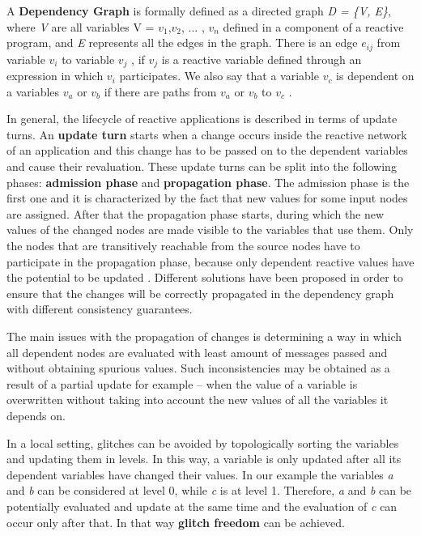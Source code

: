 \documentclass{sigplanconf}
\begin{document}
A \textbf{Dependency Graph} is formally defined as a directed graph \textit{D = \{V, E\}}, where \textit{V} are all variables V = $v_{1}$,$ v_{2}$, ... , $v_{n}$  defined in a component of a reactive program, and \textit{E} represents all the edges in the graph. There is an edge $e_{ij}$ from variable $v_{ i}$ to variable $v_{j}$ , if  $v_{j}$ is a reactive variable defined through an expression in which $v_{i}$ participates.  We also say that a variable $v_{c}$ is dependent on a variables $v_{a}$ or $v_{b}$ if there are paths from $v_{a}$ or $v_{b}$ to $v_{c}$ \cite{dream}.

In general, the lifecycle of reactive applications is described in terms of update turns.  An \textbf{update turn} starts when a change occurs inside the reactive network of an application and this change has to be passed on to the dependent variables and cause their revaluation. These update turns can be split into the following phases: \textbf{admission phase} and \textbf{propagation phase}. The admission phase is the first one and it is characterized by the fact that new values for some input nodes are assigned. After that the propagation phase starts, during which the new values of the changed nodes are made visible to the variables that use them. Only the nodes that are transitively reachable from the source nodes have to participate in the propagation phase, because only dependent reactive values have the potential to be updated \cite{sidup}. Different solutions have been proposed in order to ensure that the changes will be correctly propagated in the dependency graph with different consistency guarantees.

The main issues with the propagation of changes is determining a way in which all dependent nodes are evaluated with least amount of messages passed and without obtaining spurious values. Such inconsistencies may be obtained as a result of a partial update for example -- when the value of a variable is overwritten without taking into account the new values of all the variables it depends on. 

In a local setting, glitches can be avoided by topologically sorting the variables and updating them in levels. In this way, a variable is only updated after all its dependent variables have changed their values. In our example the variables \textit{a} and \textit{b} can be considered at level 0, while \textit{c} is at level 1. Therefore, \textit{a} and \textit{b} can be potentially evaluated and update at the same time and the evaluation of \textit{c} can occur only after that. In that way \textbf{glitch freedom} can be achieved.
\end{document}
